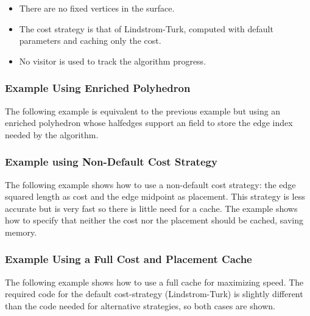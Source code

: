 \begin{itemize}
\item There are no fixed vertices in the surface.
\item The cost strategy is that of Lindstrom-Turk, computed with default parameters 
      and caching only the cost.
\item No visitor is used to track the algorithm progress.
\end{itemize}


\subsubsection{Example Using Enriched Polyhedron}

The following example is equivalent to the previous example but using an
enriched polyhedron whose halfedges support an  field to
store the edge index needed by the algorithm.


\subsubsection{Example using Non-Default Cost Strategy}

The following example shows how to use a non-default cost strategy: the edge squared length
as cost and the edge midpoint as placement. This strategy is less accurate but
is very fast so there is little need for a cache. The example shows how to specify 
that neither the cost nor the placement should be cached, saving memory.


\subsubsection{Example Using a Full Cost and Placement Cache}

The following example shows how to use a full cache for maximizing speed.
The required code for the default cost-strategy (Lindstrom-Turk) is
slightly different than the code needed for alternative strategies,
so both cases are shown.


